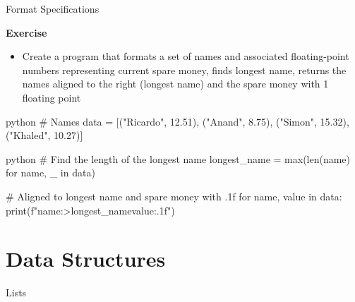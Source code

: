 \documentclass[
	11pt, 
]{beamer}
\begin{document}

\begin{frame}[fragile]{Format Specifications}

\begin{alertblock}{\textbf{Exercise}}
\begin{itemize}
    \item Create a program that formats a set of names and associated floating-point numbers representing current spare money, finds longest name, returns the names aligned to the right (longest name) and the spare money with 1 floating point
\end{itemize}
\begin{mintedbox}{python}
# Names
data = [("Ricardo",  12.51), ("Anand",     8.75),
        ("Simon",    15.32), ("Khaled",   10.27)]
\end{mintedbox} 
\end{alertblock}
\pause
\begin{mintedbox}{python}
# Find the length of the longest name
longest_name = max(len(name) for name, _ in data)

# Aligned to longest name and spare money with .1f
for name, value in data:
    print(f"{name:>{longest_name}}{value:.1f}")
\end{mintedbox} 
\end{frame}


\section{Data Structures}
\begin{frame}[fragile]{Lists}




\end{frame}

\end{document}
